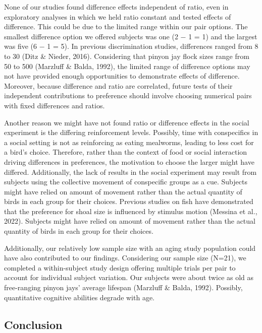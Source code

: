 \documentclass[
  ,pub,floatsintext]{apa6}
\begin{document}
None of our studies found difference effects independent of ratio, even in exploratory analyses in which we held ratio constant and tested effects of difference. This could be due to the limited range within our pair options. The smallest difference option we offered subjects was one (2 \(-\) 1 = 1) and the largest was five (6 \(-\) 1 = 5). In previous discrimination studies, differences ranged from 8 to 30 (Ditz \& Nieder, 2016). Considering that pinyon jay flock sizes range from 50 to 500 (Marzluff \& Balda, 1992), the limited range of difference options may not have provided enough opportunities to demonstrate effects of difference. Moreover, because difference and ratio are correlated, future tests of their independent contributions to preference should involve choosing numerical pairs with fixed differences and ratios.

Another reason we might have not found ratio or difference effects in the social experiment is the differing reinforcement levels. Possibly, time with conspecifics in a social setting is not as reinforcing as eating mealworms, leading to less cost for a bird's choice. Therefore, rather than the context of food or social interaction driving differences in preferences, the motivation to choose the larger might have differed. Additionally, the lack of results in the social experiment may result from subjects using the collective movement of conspecific groups as a cue. Subjects might have relied on amount of movement rather than the actual quantity of birds in each group for their choices. Previous studies on fish have demonstrated that the preference for shoal size is influenced by stimulus motion (Messina et al., 2022). Subjects might have relied on amount of movement rather than the actual quantity of birds in each group for their choices.

Additionally, our relatively low sample size with an aging study population could have also contributed to our findings. Considering our sample size (N=21), we completed a within-subject study design offering multiple trials per pair to account for individual subject variation. Our subjects were about twice as old as free-ranging pinyon jays' average lifespan (Marzluff \& Balda, 1992). Possibly, quantitative cognitive abilities degrade with age.

\hypertarget{conclusion}{%
\subsection{Conclusion}\label{conclusion}}
\end{document}
